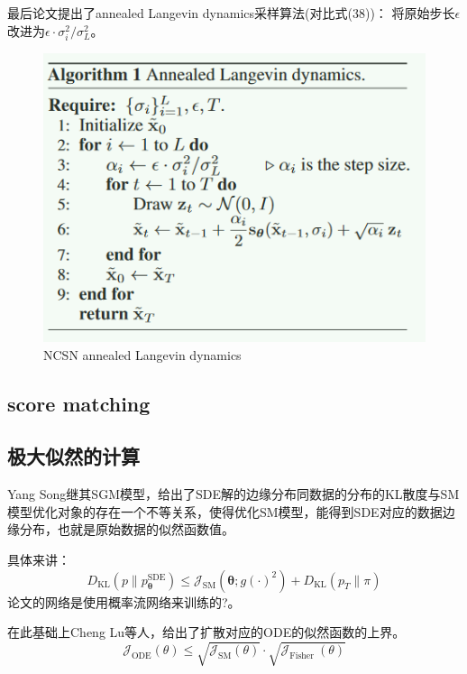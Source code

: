 \documentclass[lang=cn,newtx,10pt,scheme=chinese]{elegantbook}
\begin{document}
最后论文提出了annealed Langevin dynamics采样算法(对比式(38))：
将原始步长$\epsilon$改进为$\epsilon \cdot \sigma^2_i / \sigma^2_L$。
\begin{figure}[h!]
\centering
\includegraphics[scale=0.9]{image/NCSNLD.jpg}
\caption{NCSN annealed Langevin dynamics}
\label{fig:NCSN}
\end{figure}

\subsection{score matching}

\subsection{极大似然的计算}
Yang Song继其SGM模型，给出了SDE解的边缘分布同数据的分布的KL散度与SM模型优化对象的存在一个不等关系，使得优化SM模型，能得到SDE对应的数据边缘分布，也就是原始数据的似然函数值。

具体来讲：
\begin{equation}
D_{\mathrm{KL}}\left(p \| p_{\boldsymbol{\theta}}^{\mathrm{SDE}}\right) \leq \mathcal{J}_{\mathrm{SM}}\left(\boldsymbol{\theta} ; g(\cdot)^2\right)+D_{\mathrm{KL}}\left(p_T \| \pi\right)
\end{equation}
论文的网络是使用概率流网络来训练的?。

在此基础上Cheng Lu等人，给出了扩散对应的ODE的似然函数的上界。
\begin{equation}
\mathcal{J}_{\mathrm{ODE}}(\theta) \leq \sqrt{\mathcal{J}_{\mathrm{SM}}(\theta)} \cdot \sqrt{\mathcal{J}_{\text {Fisher }}(\theta)}
\end{equation}
\end{document}
